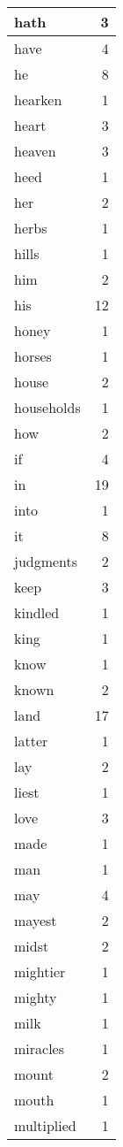 \begin{center}
\begin{longtable}{l|r}
hath & 3 \\ \hline
have & 4 \\ \hline
he & 8 \\ \hline
hearken & 1 \\ \hline
heart & 3 \\ \hline
heaven & 3 \\ \hline
heed & 1 \\ \hline
her & 2 \\ \hline
herbs & 1 \\ \hline
hills & 1 \\ \hline
him & 2 \\ \hline
his & 12 \\ \hline
honey & 1 \\ \hline
horses & 1 \\ \hline
house & 2 \\ \hline
households & 1 \\ \hline
how & 2 \\ \hline
if & 4 \\ \hline
in & 19 \\ \hline
into & 1 \\ \hline
it & 8 \\ \hline
judgments & 2 \\ \hline
keep & 3 \\ \hline
kindled & 1 \\ \hline
king & 1 \\ \hline
know & 1 \\ \hline
known & 2 \\ \hline
land & 17 \\ \hline
latter & 1 \\ \hline
lay & 2 \\ \hline
liest & 1 \\ \hline
love & 3 \\ \hline
made & 1 \\ \hline
man & 1 \\ \hline
may & 4 \\ \hline
mayest & 2 \\ \hline
midst & 2 \\ \hline
mightier & 1 \\ \hline
mighty & 1 \\ \hline
milk & 1 \\ \hline
miracles & 1 \\ \hline
mount & 2 \\ \hline
mouth & 1 \\ \hline
multiplied & 1 \\ \hline

\end{longtable}
\end{center}
